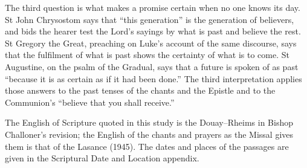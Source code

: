 The third question is what makes a promise certain when no one knows its day.
St John Chrysostom says that ``this generation'' is the generation of
believers, and bids the hearer test the Lord's sayings by what is past and
believe the rest. St Gregory the Great, preaching on Luke's account of the same
discourse, says that the fulfilment of what is past shows the certainty of
what is to come. St Augustine, on the psalm of the Gradual, says that a future
is spoken of as past ``because it is as certain as if it had been done.'' The
third interpretation applies those answers to the past tenses of the chants
and the Epistle and to the Communion's ``believe that you shall receive.''

The English of Scripture quoted in this study is the Douay--Rheims in Bishop
Challoner's revision; the English of the chants and prayers as the Missal
gives them is that of the Lasance  (1945). The dates
and places of the passages are given in the Scriptural Date and Location
appendix.

